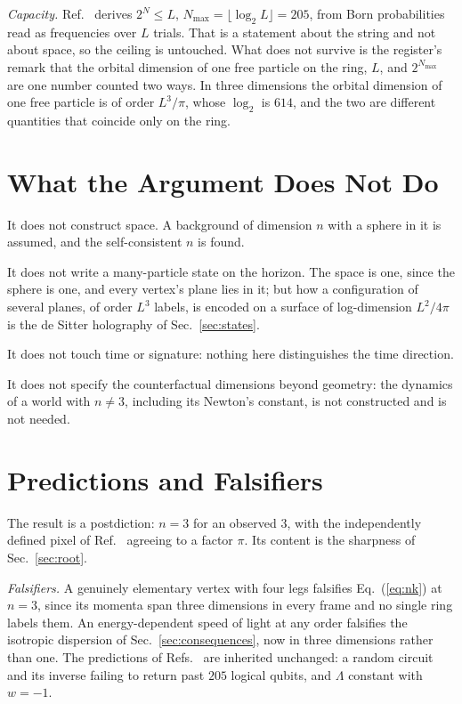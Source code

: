 \documentclass[aps,prd,twocolumn,superscriptaddress,nofootinbib]{revtex4-2}
\begin{document}
\textit{Capacity.} Ref.~\cite{korytko2026c} derives $2^N \le L$, $N_{\max} = \lfloor\log_2L\rfloor = 205$, from Born probabilities read as frequencies over $L$ trials. That is a statement about the string and not about space, so the ceiling is untouched. What does not survive is the register's remark that the orbital dimension of one free particle on the ring, $L$, and $2^{N_{\max}}$ are one number counted two ways. In three dimensions the orbital dimension of one free particle is of order $L^3/\pi$, whose $\log_2$ is $614$, and the two are different quantities that coincide only on the ring.

\section{What the Argument Does Not Do}
\label{sec:limits}

It does not construct space. A background of dimension $n$ with a sphere in it is assumed, and the self-consistent $n$ is found.

It does not write a many-particle state on the horizon. The space is one, since the sphere is one, and every vertex's plane lies in it; but how a configuration of several planes, of order $L^3$ labels, is encoded on a surface of log-dimension $L^2/4\pi$ is the de Sitter holography of Sec.~\ref{sec:states}.

It does not touch time or signature: nothing here distinguishes the time direction.

It does not specify the counterfactual dimensions beyond geometry: the dynamics of a world with $n \ne 3$, including its Newton's constant, is not constructed and is not needed.

\section{Predictions and Falsifiers}
\label{sec:pred}

The result is a postdiction: $n = 3$ for an observed $3$, with the independently defined pixel of Ref.~\cite{korytko2026} agreeing to a factor $\pi$. Its content is the sharpness of Sec.~\ref{sec:root}.

\textit{Falsifiers.} A genuinely elementary vertex with four legs falsifies Eq.~(\ref{eq:nk}) at $n = 3$, since its momenta span three dimensions in every frame and no single ring labels them. An energy-dependent speed of light at any order falsifies the isotropic dispersion of Sec.~\ref{sec:consequences}, now in three dimensions rather than one. The predictions of Refs.~\cite{korytko2026,korytko2026c} are inherited unchanged: a random circuit and its inverse failing to return past $205$ logical qubits, and $\Lambda$ constant with $w = -1$.
\end{document}
